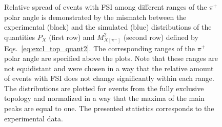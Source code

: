 \afterpage{\clearpage}

\begin{figure}[!ht]
\begin{center}
\end{center}
\caption{\small Relative spread of events with FSI among different ranges of the $\pi^{+}$ polar angle is demonstrated by the mismatch between the experimental (black) and the simulated (blue) distributions of the quantities $P_{X}$ (first row) and $M^{2}_{X[\pi^{-}]}$ (second row) defined by Eqs.~\eqref{eq:excl_top_quant2}. The corresponding ranges of the $\pi^{+}$ polar angle are specified above the plots. Note that these ranges are not equidistant and were chosen in a way that the relative amount of events with FSI does not change significantly within each range. The distributions are plotted for events from the fully exclusive topology and normalized in a way that the maxima of the main peaks are equal to one. The presented statistics corresponds to the experimental data.}
\label{fig:fsi_th_dep_pip}
\end{figure}
